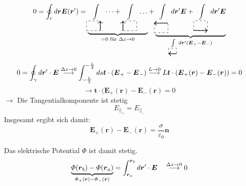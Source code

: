 \documentclass[titlepage,11pt,a4paper,ngerman]{report}
\newcommand{\tx}[1]{\textrm{#1}}
\newcommand{\ub}[1]{\underbrace{#1}}
\renewcommand{\Phi}{\varPhi}
\renewcommand{\vec}[1]{\boldsymbol{#1}}
\renewcommand{\epsilon}{\varepsilon}
\begin{document}
\begin{equation*}
0 = \oint_r d\vec{r} \vec{E}(\vec{r}') = \ub{
	\int\limits_{\begin{tikzpicture}[scale=.7]
		\draw[dashed] (0,0) -- (1,0) -- (1,.7) -- (0,.7) -- (0,0);
		\draw[thick,->] (1,0) -- (1,.7);
		\end{tikzpicture}} \dots + 
	\int\limits_{\begin{tikzpicture}[scale=.7]
		\draw[dashed] (0,0) -- (1,0) -- (1,.7) -- (0,.7) -- (0,0);
		\draw[thick,->] (0,0) -- (0,.7);
		\end{tikzpicture}} \dots}_{= 0 \tx{ für } \Delta z \to 0} + \ub{
	\int\limits_{\begin{tikzpicture}[scale=.7]
		\draw[dashed] (0,0) -- (1,0) -- (1,.7) -- (0,.7) -- (0,0);
		\draw[thick,->] (1,.7) -- (0,.7);
		\end{tikzpicture}} d\vec{r}' \vec{E} + 
	\int\limits_{\begin{tikzpicture}[scale=.7]
		\draw[dashed] (0,0) -- (1,0) -- (1,.7) -- (0,.7) -- (0,0);
		\draw[thick,->] (0,0) -- (1,0);
		\end{tikzpicture}} d\vec{r}' \vec{E} }_{
	\int\limits_{\begin{tikzpicture}[scale=.4]
		\draw[dashed] (0,0) -- (1,0) -- (1,.7) -- (0,.7) -- (0,0);
		\draw[thick,->] (1,0) -- (0,0);
		\end{tikzpicture}} d\vec{r}' (\vec{E}_+ -  \vec{E}_-)}
\end{equation*}
\begin{equation*}
0 = \oint_\gamma d\vec{r}' \cdot \vec{E} \buildrel \Delta z \to 0 \over \longrightarrow \int_{-\frac{L}{2}}^{-\frac{L}{2}} ds \vec{t} \cdot \left(\vec{E}_+ - \vec{E}_-\right) \buildrel L \to 0 \over \longrightarrow L \vec{t} \cdot \left(\vec{E}_+(\vec{r}) - \vec{E}_-(\vec{r})\right) = 0
\end{equation*}
\begin{equation*}
\rightarrow \vec{t} \cdot (\vec{E}_+ (\vec{r}) - \vec{E}_- (\vec{r}) = 0
\end{equation*}
$\rightarrow $ Die Tangentialkomponente ist stetig
\begin{equation*}
E_{\parallel_{+}} = E_{\parallel_{-}}
\end{equation*}
Insgesamt ergibt sich damit:
\begin{equation*}
\vec{E}_+(\vec{r}) - \vec{E}_-(\vec{r}) = \frac{\sigma}{\epsilon_0} \vec{n}
\end{equation*}
\begin{minipage}{.6\linewidth}
	Das elektrische Potential $ \Phi $ ist damit stetig.
	\begin{equation*}
	\ub{\Phi(\vec{r}_b) - \Phi(\vec{r}_a)}_{\Phi_+(\vec{r}) - \Phi_-(\vec{r})} = \int_{\vec{r}_a}^{\vec{r}_b} d\vec{r}' \cdot \vec{E} \quad \buildrel \Delta z \to 0 \over \longrightarrow 0
	\end{equation*}
\end{minipage}%
\end{document}
